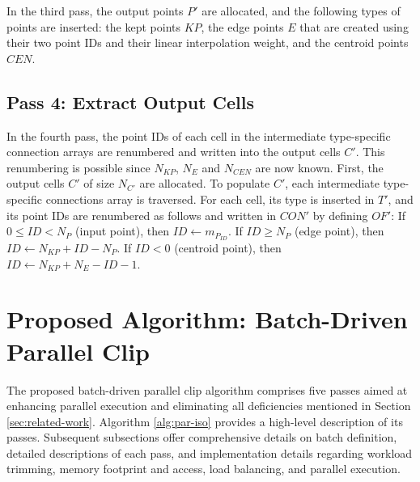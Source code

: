 \documentclass{egpubl}
\begin{document}
In the third pass, the output points $P'$ are allocated, and the following types of points are inserted: the kept points $KP$, the edge points $E$ that are created using their two point IDs and their linear interpolation weight, and the centroid points $CEN$.

\subsection{Pass 4: Extract Output Cells}

In the fourth pass, the point IDs of each cell in the intermediate type-specific connection arrays are renumbered and written into the output cells $C'$. This renumbering is possible since $N_{KP}$, $N_E$ and $N_{CEN}$ are now known. First, the output cells $C'$ of size $N_{C'}$ are allocated. To populate $C'$, each intermediate type-specific connections array is traversed. For each cell, its type is inserted in $T'$, and its point IDs are renumbered as follows and written in $CON'$ by defining $OF'$:
If $0 \leq ID < N_P$ (input point), then $ID \gets m_{P_{ID}}$.
If $ID \geq N_P$ (edge point), then $ID \gets N_{KP} + ID - N_P$.
If $\textit{ID} < 0 $ (centroid point), then $ID \gets N_{KP} + N_E - ID - 1$.

\section{Proposed Algorithm: Batch-Driven Parallel Clip}
\label{sec:batch-driven-parallel-clip-algorithm}

The proposed batch-driven parallel clip algorithm comprises five passes aimed at enhancing parallel execution and eliminating all deficiencies mentioned in Section \ref{sec:related-work}. Algorithm \ref{alg:par-iso} provides a high-level description of its passes. Subsequent subsections offer comprehensive details on batch definition, detailed descriptions of each pass, and implementation details regarding workload trimming, memory footprint and access, load balancing, and parallel execution.
\end{document}
